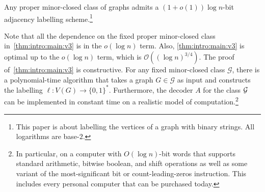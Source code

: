\documentclass{patmorin}
\newcommand{\david}[1]{{\color{orange} DW: #1}}
\newcommand{\piotr}[1]{\textcolor{red}{PiMi: #1}}
\newcommand{\calG}{\mathcal{G}}
\newcommand{\Oh}{\mathcal{O}}
\begin{document}


\begin{thm}
\label{thm:intro:main:v3}\label{main_result}
Any proper minor-closed class of graphs admits
a $(1+o(1))\log n$-bit adjacency labelling scheme.\footnote{This paper is about labelling the vertices of a graph with binary strings.  All logarithms are base-$2$.}
\end{thm}




Note that all the dependence on the fixed proper minor-closed class in~\cref{thm:intro:main:v3} is in the $o(\log n)$ term. Also, \cref{thm:intro:main:v3} is optimal up to the $o(\log n)$ term,
which is $\Oh\left((\log n)^{3/4}\right)$.
The proof of~\cref{thm:intro:main:v3} is constructive. For any fixed minor-closed class $\calG$, there is a polynomial-time algorithm that takes a graph $G\in\calG$ as input and constructs the labelling $\ell:V(G)\to\{0,1\}^*$. Furthermore, the decoder $A$ for the class $\cal G$ can be implemented in constant time on a realistic model of computation.\footnote{In particular, on a computer with $O(\log n)$-bit words that supports standard arithmetic, bitwise boolean, and shift operations as well as some variant of the most-significant bit or count-leading-zeros instruction. This includes every personal computer that can be purchased today.}
\end{document}
